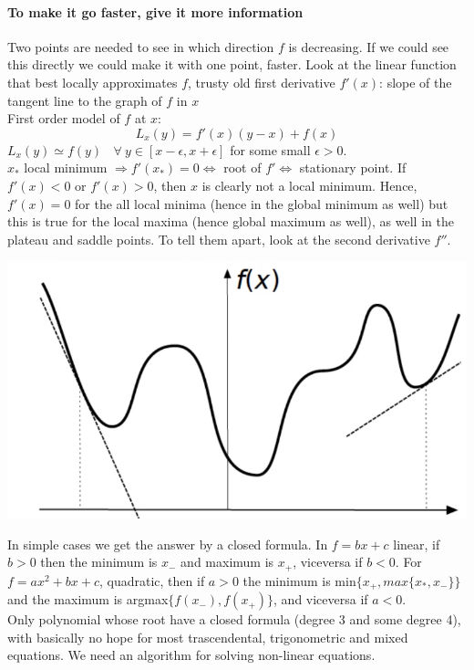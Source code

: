\documentclass[10pt]{report}
\begin{document}
\paragraph{To make it go faster, give it more information} Two points are needed to see in which direction $f$ is decreasing. If we could see this directly we could make it with one point, faster. Look at the linear function that best locally approximates $f$, trusty old first derivative $f'(x)$: slope of the tangent line to the graph of $f$ in $x$\\
First order model of $f$ at $x$: $$L_x(y)=f'(x)(y-x) + f(x)$$ $L_x(y) \simeq f(y)\:\:\:\:\forall\:y\in[x-\epsilon, x+\epsilon]$ for some small $\epsilon > 0$.\\
$x_*$ local minimum $\Rightarrow f'(x_*) = 0 \Leftrightarrow$ root of $f' \Leftrightarrow$ stationary point. If $f'(x) < 0$ or $f'(x) > 0$, then $x$ is clearly not a local minimum. Hence, $f'(x) = 0$ for the all local minima (hence in the global minimum as well) but this is true for the local maxima (hence global maximum as well), as well in the plateau and saddle points. To tell them apart, look at the second derivative $f''$.
\begin{center}
	\includegraphics[scale=0.5]{1.png}
\end{center}
In simple cases we get the answer by a closed formula. In $f = bx + c$ linear, if $b > 0$ then the minimum is $x_-$ and maximum is $x_+$, viceversa if $b < 0$. For $f = ax^2 + bx + c$, quadratic, then if $a > 0$ the minimum is min$\{ x_+, max\{x_*, x_-\}\}$ and the maximum is argmax$\{f(x_-), f(x_+)\}$, and viceversa if $a < 0$.\\
Only polynomial whose root have a closed formula (degree 3 and some degree 4), with basically no hope for most trascendental, trigonometric and mixed equations. We need an algorithm for solving non-linear equations.
\end{document}
